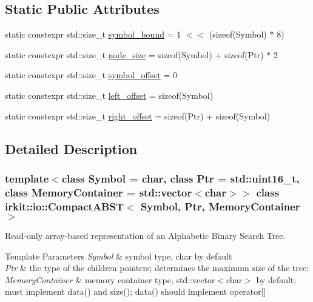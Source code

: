 \subsection*{Static Public Attributes}
\begin{DoxyCompactItemize}
\item 
static constexpr std\+::size\+\_\+t \mbox{\hyperlink{classirkit_1_1io_1_1CompactABST_ac57833960df6fee1cf2643e82cfb0216}{symbol\+\_\+bound}} = 1 $<$$<$ (sizeof(Symbol) $\ast$ 8)
\item 
static constexpr std\+::size\+\_\+t \mbox{\hyperlink{classirkit_1_1io_1_1CompactABST_ada82da5e8d33fc09b71a0610d14ddaef}{node\+\_\+size}} = sizeof(Symbol) + sizeof(Ptr) $\ast$ 2
\item 
static constexpr std\+::size\+\_\+t \mbox{\hyperlink{classirkit_1_1io_1_1CompactABST_a79cef12b8e2acd8b65c106deb9d87ebe}{symbol\+\_\+offset}} = 0
\item 
static constexpr std\+::size\+\_\+t \mbox{\hyperlink{classirkit_1_1io_1_1CompactABST_a98a0e7d750d139b65ad0df0a04ed3cb0}{left\+\_\+offset}} = sizeof(Symbol)
\item 
static constexpr std\+::size\+\_\+t \mbox{\hyperlink{classirkit_1_1io_1_1CompactABST_a924136dbb9bc8ff411804c2124ebd508}{right\+\_\+offset}} = sizeof(Ptr) + sizeof(Symbol)
\end{DoxyCompactItemize}


\subsection{Detailed Description}
\subsubsection*{template$<$class Symbol = char, class Ptr = std\+::uint16\+\_\+t, class Memory\+Container = std\+::vector$<$char$>$$>$\newline
class irkit\+::io\+::\+Compact\+A\+B\+S\+T$<$ Symbol, Ptr, Memory\+Container $>$}

Read-\/only array-\/based representation of an Alphabetic Binary Search Tree. 


\begin{DoxyTemplParams}{Template Parameters}
{\em Symbol} & symbol type, {\ttfamily char} by default \\
\hline
{\em Ptr} & the type of the children pointers; determines the maximum size of the tree; \\
\hline
{\em Memory\+Container} & memory container type, std\+::vector$<$char$>$ by default; must implement data() and size(); data() should implement operator\mbox{[}\mbox{]} \\
\hline
\end{DoxyTemplParams}


